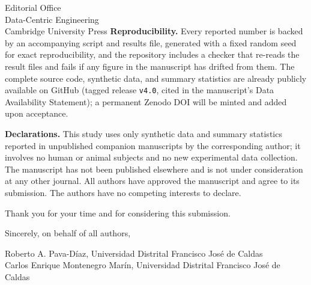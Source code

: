 \documentclass[12pt,a4paper]{letter}
\begin{document}
\begin{letter}{Editorial Office\\Data-Centric Engineering\\Cambridge University Press}
\textbf{Reproducibility.} Every reported number is backed by an accompanying script and results file, generated with a fixed random seed for exact reproducibility, and the repository includes a checker that re-reads the result files and fails if any figure in the manuscript has drifted from them. The complete source code, synthetic data, and summary statistics are already publicly available on GitHub (tagged release \texttt{v4.0}, cited in the manuscript's Data Availability Statement); a permanent Zenodo DOI will be minted and added upon acceptance.

\textbf{Declarations.} This study uses only synthetic data and summary statistics reported in unpublished companion manuscripts by the corresponding author; it involves no human or animal subjects and no new experimental data collection. The manuscript has not been published elsewhere and is not under consideration at any other journal. All authors have approved the manuscript and agree to its submission. The authors have no competing interests to declare.

Thank you for your time and for considering this submission.

\closing{Sincerely, on behalf of all authors,}

\vspace{1em}
\noindent Roberto A. Pava-D\'iaz, Universidad Distrital Francisco Jos\'e de Caldas\\
Carlos Enrique Montenegro Mar\'in, Universidad Distrital Francisco Jos\'e de Caldas

\end{letter}
\end{document}
